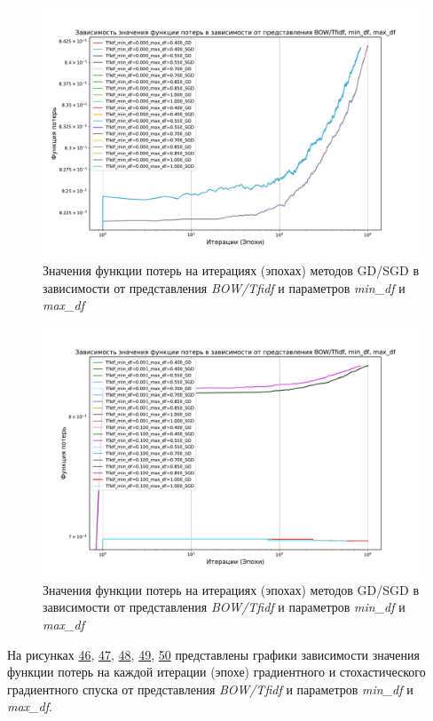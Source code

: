 \documentclass[14pt]{extarticle}
\begin{document}
\begin{figure}[H]
    \centering
    \includegraphics[width=0.85\linewidth]
    {exp_8_min_max_df_loss_4.pdf}
    \caption{Значения функции потерь на итерациях (эпохах) методов GD/SGD в зависимости от представления \textit{BOW/Tfidf} и параметров \textit{min\_df} и \textit{max\_df}}
    \label{fig:exp_8_min_max_df_loss_4}
\end{figure}

\begin{figure}[H]
    \centering
    \includegraphics[width=0.85\linewidth]
    {exp_8_min_max_df_loss_5.pdf}
    \caption{Значения функции потерь на итерациях (эпохах) методов GD/SGD в зависимости от представления \textit{BOW/Tfidf} и параметров \textit{min\_df} и \textit{max\_df}}
    \label{fig:exp_8_min_max_df_loss_5}
\end{figure}

На рисунках \hyperref[fig:exp_8_min_max_df_loss_1]{46}, \hyperref[fig:exp_8_min_max_df_loss_2]{47}, \hyperref[fig:exp_8_min_max_df_loss_3]{48}, \hyperref[fig:exp_8_min_max_df_loss_4]{49}, \hyperref[fig:exp_8_min_max_df_loss_5]{50}  представлены графики зависимости значения функции потерь на каждой итерации (эпохе) градиентного и стохастического градиентного спуска от представления \textit{BOW/Tfidf} и параметров \textit{min\_df} и \textit{max\_df}.
\end{document}
